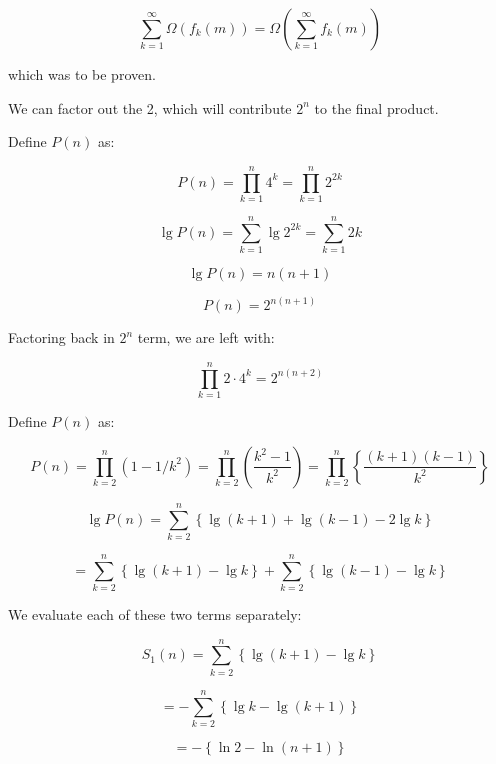 \documentclass[a4paper,12pt]{article}
\begin{document}
\[ \sum_{k=1}^\infty \Omega (f_k(m))  = \Omega \left(\sum_{k=1}^\infty f_k(m) \right) \]

which was to be proven.

\vspace{5mm}

We can factor out the 2, which will contribute $2^n$ to the final product.

\vspace{2mm}
Define $P(n)$ as:

\[ P(n) = \prod_{k=1}^n 4^k = \prod_{k=1}^n 2^{2k} \]

\[ \lg P(n) = \sum_{k=1}^n \lg 2^{2k} = \sum_{k=1}^n 2k \]

\[ \lg P(n) = n(n+1) \]

\[ P(n) = 2^{n(n+1)} \]

Factoring back in $2^n$ term, we are left with:

\[ \prod_{k=1}^n 2 \cdot 4^k = 2^{n(n+2)} \]


Define $P(n)$ as:

\[ P(n) = \prod_{k=2}^n \left(1 - 1/k^2\right) = \prod_{k=2}^n\left( \frac{k^2-1}{k^2} \right) = \prod_{k=2}^n \left\{ \frac{(k+1)(k-1)}{k^2}\right\} \]

\[ \lg P(n) = \sum_{k=2}^n \left\{\lg (k+1) + \lg(k-1) - 2\lg k \right\}\]

\[ = \sum_{k=2}^n \left\{ \lg(k+1) - \lg k \right\}+ \sum_{k=2}^n \left\{\lg(k-1) - \lg k \right\} \]

We evaluate each of these two terms separately:

\[ S_1(n) = \sum_{k=2}^n \left\{\lg(k+1) - \lg k\right\} \]

\[ = -\sum_{k=2}^n \left\{\lg k - \lg(k+1) \right\} \]

\[ = -\left\{\ln 2 - \ln(n+1)\right\}\]
\end{document}
